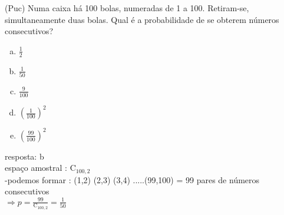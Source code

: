 \begin{ex}
 (Puc) Numa caixa há 100 bolas, numeradas de 1 a 100. Retiram-se, simultaneamente duas bolas.  Qual é a probabilidade de se obterem números consecutivos?
    \begin{enumerate}[(a)]
    \item $\frac{1}{2}$
    \item $\frac{1}{50}$
    \item $\frac{9}{100}$
    \item $(\frac{1}{100})^2$
    \item $(\frac{99}{100})^2$
    \end{enumerate}
      \begin{sol}
        resposta: b \\
        espaço amostral : $\mathrm{C}_{{100},2}$ \\
        -podemos formar : (1,2) (2,3) (3,4) .....(99,100) = 99 pares de números consecutivos \\
        $\Longrightarrow p=\frac{99}{\mathrm{C}_{{100},2}}=\frac{1}{50}$
      \end{sol}
    
\end{ex}
